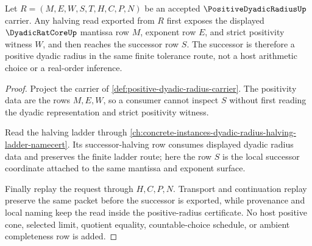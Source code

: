 \begin{theorem}
\label{thm:positive-dyadic-radius-halving}
Let $R=(M,E,W,S,T,H,C,P,N)$ be an accepted $\PositiveDyadicRadiusUp$ carrier. Any halving read exported from $R$ first exposes the displayed $\DyadicRatCoreUp$ mantissa row $M$, exponent row $E$, and strict positivity witness $W$, and then reaches the successor row $S$. The successor is therefore a positive dyadic radius in the same finite tolerance route, not a host arithmetic choice or a real-order inference.
\end{theorem}
\begin{proof}
Project the carrier of \autoref{def:positive-dyadic-radius-carrier}. The positivity data are the rows $M,E,W$, so a consumer cannot inspect $S$ without first reading the dyadic representation and strict positivity witness.

Read the halving ladder through \autoref{ch:concrete-instances-dyadic-radius-halving-ladder-namecert}. Its successor-halving row consumes displayed dyadic radius data and preserves the finite ladder route; here the row $S$ is the local successor coordinate attached to the same mantissa and exponent surface.

Finally replay the request through $H,C,P,N$. Transport and continuation replay preserve the same packet before the successor is exported, while provenance and local naming keep the read inside the positive-radius certificate. No host positive cone, selected limit, quotient equality, countable-choice schedule, or ambient completeness row is added.
\end{proof}

